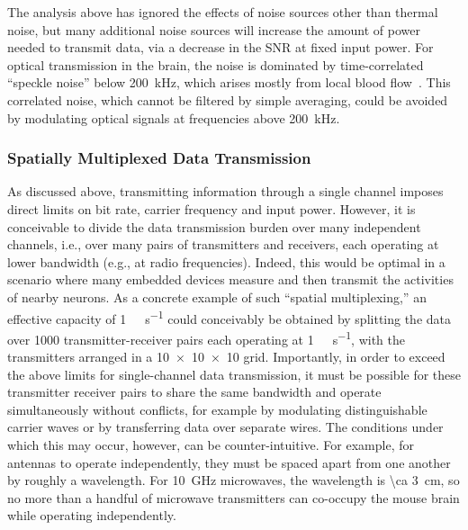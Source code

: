 The analysis above has ignored the effects of noise sources other than thermal noise, but many additional noise sources will increase the amount of power needed to transmit data, via a decrease in the SNR at fixed input power.
For optical transmission in the brain, the noise is dominated by time-correlated ``speckle noise'' below \SI{200}{\kilo\hertz}, which arises mostly from local blood flow~\cite{carp11}.
This correlated noise, which cannot be filtered by simple averaging, could be avoided by modulating optical signals at frequencies above \SI{200}{\kHz}.

\subsubsection{Spatially Multiplexed Data Transmission}

As discussed above, transmitting information through a single channel imposes direct limits on bit rate, carrier frequency and input power.
However, it is conceivable to divide the data transmission burden over many independent channels, i.e., over many pairs of transmitters and receivers, each operating at lower bandwidth (e.g., at radio frequencies).
Indeed, this would be optimal in a scenario where many embedded devices measure and then transmit the activities of nearby neurons.
As a concrete example of such ``spatial multiplexing,'' an effective capacity of \SI{1}{\tera\bit\per\second} could conceivably be obtained by splitting the data over \num{1000} transmitter-receiver pairs each operating at \SI{1}{\giga\bit\per\second}, with the transmitters arranged in a \num{10 x 10 x 10} grid.
Importantly, in order to exceed the above limits for single-channel data transmission, it must be possible for these transmitter receiver pairs to share the same bandwidth and operate simultaneously without conflicts, for example by modulating distinguishable carrier waves or by transferring data over separate wires.
The conditions under which this may occur, however, can be counter-intuitive.
For example, for antennas to operate independently, they must be spaced apart from one another by roughly a wavelength.
For \SI{10}{\giga\hertz} microwaves, the wavelength is \SI{\ca 3}{\centi\meter}, so no more than a handful of microwave transmitters can co-occupy the mouse brain while operating independently.


